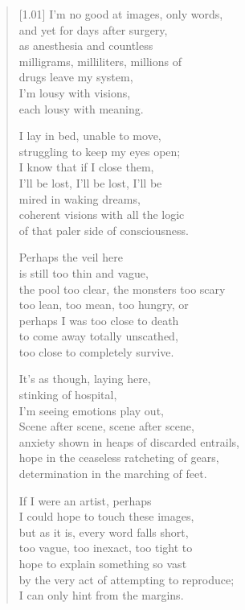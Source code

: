 \begin{verse}[1.01\textwidth]
I'm no good at images, only words,\\
and yet for days after surgery,\\
as anesthesia and countless\\
\vin milligrams, milliliters, millions of\\
drugs leave my system,\\
I'm lousy with visions,\\
each lousy with meaning.

I lay in bed, unable to move,\\
struggling to keep my eyes open;\\
I know that if I close them,\\
\vin I'll be lost, I'll be lost, I'll be\\
mired in waking dreams,\\
coherent visions with all the logic\\
of that paler side of consciousness.

Perhaps the veil here\\
is still too thin and vague,\\
the pool too clear, the monsters too scary\\
\vin too lean, too mean, too hungry, or\\
perhaps I was too close to death\\
to come away totally unscathed,\\
too close to completely survive.

\newpage
\null
\vspace{0.01em}

\vin It's as though, laying here,\\
\vin stinking of hospital,\\
\vin I'm seeing emotions play out,\\
\vin \vin Scene after scene, scene after scene,\\
\vin anxiety shown in heaps of discarded entrails,\\
\vin hope in the ceaseless ratcheting of gears,\\
\vin determination in the marching of feet.

If I were an artist, perhaps\\
I could hope to touch these images,\\
but as it is, every word falls short,\\
\vin too vague, too inexact, too tight to\\
hope to explain something so vast\\
by the very act of attempting to reproduce;\\
I can only hint from the margins.


\end{verse}
